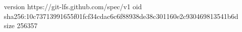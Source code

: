 version https://git-lfs.github.com/spec/v1
oid sha256:10c73713991655f01fcf34cdac6c6f88938de38c301160e2c930469813541b6d
size 256357

